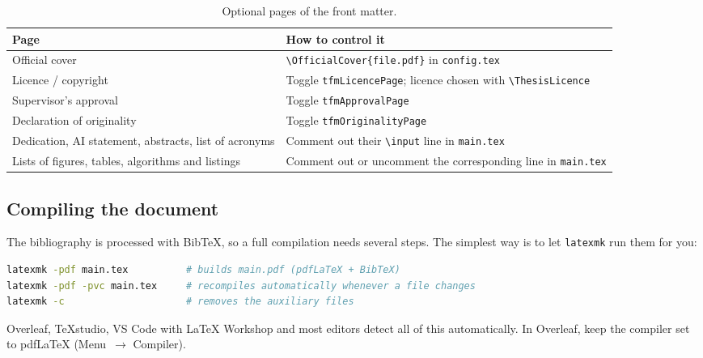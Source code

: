 \begin{table}[ht!]
  \centering
  \small
  \caption{Optional pages of the front matter.}
  \label{tab:optional-pages}
  \begin{tabular}{@{}p{5.2cm} p{9.6cm}@{}}
    \toprule
    \textbf{Page} & \textbf{How to control it} \\
    \midrule
    Official cover             & \raggedright \texttt{\textbackslash OfficialCover\{file.pdf\}} in
                                 \texttt{config.tex} \tabularnewline
    Licence / copyright        & \raggedright Toggle \texttt{tfmLicencePage}; licence chosen with
                                 \texttt{\textbackslash ThesisLicence} \tabularnewline
    Supervisor's approval      & \raggedright Toggle \texttt{tfmApprovalPage} \tabularnewline
    Declaration of originality & \raggedright Toggle \texttt{tfmOriginalityPage} \tabularnewline
    \raggedright Dedication, AI statement, abstracts, list of acronyms
                               & \raggedright Comment out their \texttt{\textbackslash input} line in
                                 \texttt{main.tex} \tabularnewline
    \raggedright Lists of figures, tables, algorithms and listings
                               & \raggedright Comment out or uncomment the corresponding line in
                                 \texttt{main.tex} \tabularnewline
    \bottomrule
  \end{tabular}
\end{table}

\subsection{Compiling the document}\label{sec:compiling}

The bibliography is processed with BibTeX, so a full compilation needs several steps. The
simplest way is to let \texttt{latexmk} run them for you:

\begin{lstlisting}[language=bash, caption={Compiling the thesis from the command line.}, label=lst:compile]
latexmk -pdf main.tex          # builds main.pdf (pdfLaTeX + BibTeX)
latexmk -pdf -pvc main.tex     # recompiles automatically whenever a file changes
latexmk -c                     # removes the auxiliary files
\end{lstlisting}

Overleaf, TeXstudio, VS Code with LaTeX Workshop and most editors detect all of this
automatically. In Overleaf, keep the compiler set to pdfLaTeX (Menu~$\rightarrow$
Compiler).

